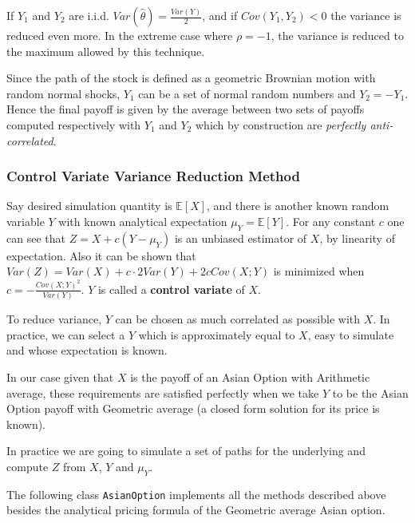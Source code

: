 If $Y_1$ and $Y_2$ are i.i.d. $Var(\hat{\theta})=\frac{Var(Y)}{2}$, and if $Cov(Y_1, Y_2)<0$ the variance is reduced even more. In the extreme case where $\rho=-1$, the variance is reduced to the maximum allowed by this technique. 

Since the path of the stock is defined as a geometric Brownian motion with random normal shocks, $Y_1$ can be a set of normal random numbers and $Y_2 = -Y_1$. Hence the final payoff is given by the average between two sets of payoffs computed respectively with $Y_1$ and $Y_2$ which by construction are \emph{perfectly anti-correlated}. 

\subsubsection{Control Variate Variance Reduction Method}

Say desired simulation quantity is $\mathbb{E}[X]$, and there is another known random variable $Y$ with known analytical expectation $\mu_Y = \mathbb{E}[Y]$. For any constant $c$ one can see that $Z = X + c(Y -\mu_Y)$ is an unbiased estimator of $X$, by linearity of expectation. Also it can be shown that $Var(Z) = Var(X) + c\cdot 2 Var(Y) + 2c Cov(X; Y)$ is minimized when $c = -\frac{Cov(X;Y)^2}{Var(Y)}$. 
$Y$ is called a \textbf{control variate} of $X$. 

To reduce variance, $Y$ can be chosen as much correlated as possible with $X$. In practice, we can select a $Y$ which is approximately equal to $X$, easy to simulate and whose expectation is known. 

In our case given that $X$ is the payoff of an Asian Option with Arithmetic average, these requirements are satisfied perfectly when we take $Y$ to be the Asian Option payoff with Geometric average (a closed form solution for its price is known).

In practice we are going to simulate a set of paths for the underlying and compute $Z$ from  $X$, $Y$ and $\mu_Y$.

\begin{finmarkets}
The following class \texttt{AsianOption} implements all the methods described above besides the analytical pricing formula of the Geometric average Asian option.
\end{finmarkets}

